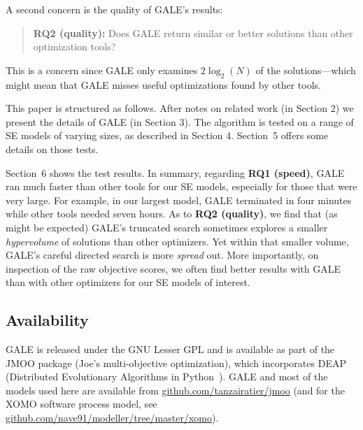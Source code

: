 \documentclass[10pt,journal,compsoc]{IEEEtran}
\begin{document}
A second concern  is the quality of GALE's results:
\begin{quote}
{\bf RQ2 (quality):} Does GALE return similar or better solutions than other optimization tools?
\end{quote}
This is a concern since GALE only examines $2\log_2(N)$ of the solutions---which might mean that GALE misses useful optimizations found by other tools.

This paper is structured as follows.
After  notes on related work (in Section 2) we present the  details of GALE (in Section 3). 
The algorithm is  tested on a range of SE models of varying sizes, as described in Section 4.
 Section~5 offers some details on those tests.
 
 Section~6 shows the test results. In summary,
 regarding   {\bf RQ1 (speed)}, GALE ran much faster than other tools for our SE models, especially for those that were very large.
For example, in our largest model, GALE terminated in four minutes while other tools needed seven hours.
As to {\bf RQ2 (quality)}, we find that (as might be expected) GALE's truncated search sometimes explores a smaller  {\em hypervolume}  of solutions than other optimizers.
Yet within that smaller volume,   GALE's careful directed search is more {\em spread} out. 
More importantly, on inspection of  the raw objective scores, we often find better results with GALE than with other optimizers for our SE models of interest. 

 


\subsection{Availability}\label{sec:avail}

GALE is released under the GNU Lesser GPL and is available
as part of the JMOO package (Joe's multi-objective optimization), which
incorporates DEAP (Distributed Evolutionary Algorithms in Python~\cite{jmlr12}).
GALE and most of the models used here are available 
from \url{github.com/tanzairatier/jmoo} (and for the XOMO software process model, see
\url{github.com/nave91/modeller/tree/master/xomo}).


\end{document}
